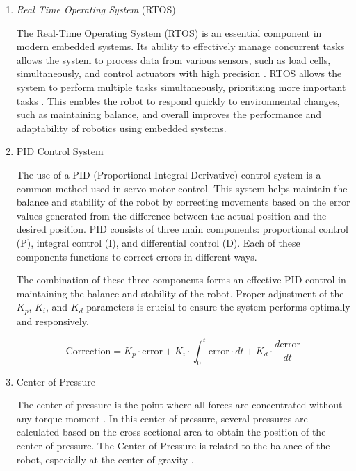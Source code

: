 \begin{enumerate}[label=\Alph*.]
    \item \textit{Real Time Operating System} (RTOS)
    \label{subsec:rtos}

    \hspace*{1em} The Real-Time Operating System (RTOS) is an essential component in modern embedded systems. Its ability to effectively manage concurrent tasks allows the system to process data from various sensors, such as load cells, simultaneously, and control actuators with high precision \cite{sayyad2023real}. RTOS allows the system to perform multiple tasks simultaneously, prioritizing more important tasks \cite{digikey2021task}. This enables the robot to respond quickly to environmental changes, such as maintaining balance, and overall improves the performance and adaptability of robotics using embedded systems.

    \item PID Control System
    \label{subsec:sistemkontrolpid}

    \hspace*{1em} The use of a PID (Proportional-Integral-Derivative) control system is a common method used in servo motor control. This system helps maintain the balance and stability of the robot by correcting movements based on the error values generated from the difference between the actual position and the desired position. PID consists of three main components: proportional control (P), integral control (I), and differential control (D). Each of these components functions to correct errors in different ways.

    \hspace*{1em} The combination of these three components forms an effective PID control in maintaining the balance and stability of the robot. Proper adjustment of the $K_p$, $K_i$, and $K_d$ parameters is crucial to ensure the system performs optimally and responsively.

    \begin{equation}
      \mathrm{Correction} = K_p \cdot \mathrm{error} + K_i \cdot \int_{0}^{t} \mathrm{error} \cdot dt + K_d \cdot \frac{d\mathrm{error}}{dt}
    \end{equation}

    \item Center of Pressure
    \label{subsec:pusattekanan}

    \hspace*{1em} The center of pressure is the point where all forces are concentrated without any torque moment \cite{hawley2016external}. In this center of pressure, several pressures are calculated based on the cross-sectional area to obtain the position of the center of pressure. The Center of Pressure is related to the balance of the robot, especially at the center of gravity \cite{arifin2017implementasi}.


\end{enumerate}
